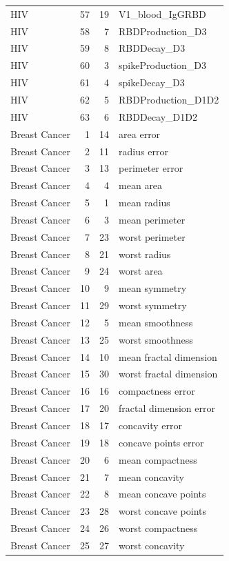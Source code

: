 \begin{longtable}{lrrp{}}
HIV & 57 & 19 & V1\_blood\_IgGRBD \\
HIV & 58 & 7 & RBDProduction\_D3 \\
HIV & 59 & 8 & RBDDecay\_D3 \\
HIV & 60 & 3 & spikeProduction\_D3 \\
HIV & 61 & 4 & spikeDecay\_D3 \\
HIV & 62 & 5 & RBDProduction\_D1D2 \\
HIV & 63 & 6 & RBDDecay\_D1D2 \\
Breast Cancer & 1 & 14 & area error \\
Breast Cancer & 2 & 11 & radius error \\
Breast Cancer & 3 & 13 & perimeter error \\
Breast Cancer & 4 & 4 & mean area \\
Breast Cancer & 5 & 1 & mean radius \\
Breast Cancer & 6 & 3 & mean perimeter \\
Breast Cancer & 7 & 23 & worst perimeter \\
Breast Cancer & 8 & 21 & worst radius \\
Breast Cancer & 9 & 24 & worst area \\
Breast Cancer & 10 & 9 & mean symmetry \\
Breast Cancer & 11 & 29 & worst symmetry \\
Breast Cancer & 12 & 5 & mean smoothness \\
Breast Cancer & 13 & 25 & worst smoothness \\
Breast Cancer & 14 & 10 & mean fractal dimension \\
Breast Cancer & 15 & 30 & worst fractal dimension \\
Breast Cancer & 16 & 16 & compactness error \\
Breast Cancer & 17 & 20 & fractal dimension error \\
Breast Cancer & 18 & 17 & concavity error \\
Breast Cancer & 19 & 18 & concave points error \\
Breast Cancer & 20 & 6 & mean compactness \\
Breast Cancer & 21 & 7 & mean concavity \\
Breast Cancer & 22 & 8 & mean concave points \\
Breast Cancer & 23 & 28 & worst concave points \\
Breast Cancer & 24 & 26 & worst compactness \\
Breast Cancer & 25 & 27 & worst concavity \\

\end{longtable}
